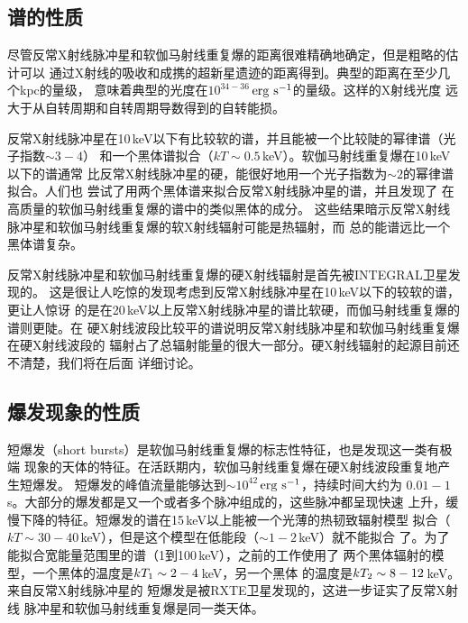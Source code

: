 \subsection{谱的性质}

尽管反常X射线脉冲星和软伽马射线重复爆的距离很难精确地确定，但是粗略的估计可以
通过X射线的吸收和成携的超新星遗迹的距离得到。典型的距离在至少几个kpc的量级，
意味着典型的光度在$10^{34-36}$\,$\rm{erg\ s^{-1}}$的量级。这样的X射线光度
远大于从自转周期和自转周期导数得到的自转能损。

反常X射线脉冲星在10\,keV以下有比较软的谱，并且能被一个比较陡的幂律谱（光子指数$\sim3-4$）
和一个黑体谱拟合（$kT\sim0.5$\,keV）。软伽马射线重复爆在10\,keV以下的谱通常
比反常X射线脉冲星的硬，能很好地用一个光子指数为$\sim2$的幂律谱拟合。人们也
尝试了用两个黑体谱来拟合反常X射线脉冲星的谱\supercite{m08,hg05}，并且发现了
在高质量的软伽马射线重复爆的谱中的类似黑体的成分\supercite{m08,mte+05,met+06}。
这些结果暗示反常X射线脉冲星和软伽马射线重复爆的软X射线辐射可能是热辐射，而
总的能谱远比一个黑体谱复杂\supercite{m08}。

反常X射线脉冲星和软伽马射线重复爆的硬X射线辐射是首先被INTEGRAL卫星发现的\supercite{khm04,dhk+06,mgm+05,gmt+06}。
这是很让人吃惊的发现考虑到反常X射线脉冲星在10\,keV以下的较软的谱，更让人惊讶
的是在20\,keV以上反常X射线脉冲星的谱比软硬，而伽马射线重复爆的谱则更陡。在
硬X射线波段比较平的谱说明反常X射线脉冲星和软伽马射线重复爆在硬X射线波段的
辐射占了总辐射能量的很大一部分。硬X射线辐射的起源目前还不清楚，我们将在后面
详细讨论。

\subsection{爆发现象的性质}

短爆发（short bursts）是软伽马射线重复爆的标志性特征，也是发现这一类有极端
现象的天体的特征。在活跃期内，软伽马射线重复爆在硬X射线波段重复地产生短爆发。
短爆发的峰值流量能够达到$\sim10^{42}$\,$\rm{erg\ s^{-1}}$，持续时间大约为
$0.01-1$\,s。大部分的爆发都是又一个或者多个脉冲组成的，这些脉冲都呈现快速
上升，缓慢下降的特征。短爆发的谱在15\,keV以上能被一个光薄的热韧致辐射模型
拟合（$kT\sim30-40$\,keV），但是这个模型在低能段（$\sim1-2$\,keV）就不能拟合
了\supercite{flu94}。为了能拟合宽能量范围里的谱（1到100\,keV），之前的工作使用了
两个黑体辐射的模型，一个黑体的温度是$kT_{\rm{1}}\sim2-4$\,keV，另一个黑体
的温度是$kT_{\rm{2}}\sim8-12$\,keV\supercite{fcm+04}。来自反常X射线脉冲星的
短爆发是被RXTE卫星发现的\supercite{klc00,kgw+03}，这进一步证实了反常X射线
脉冲星和软伽马射线重复爆是同一类天体。

